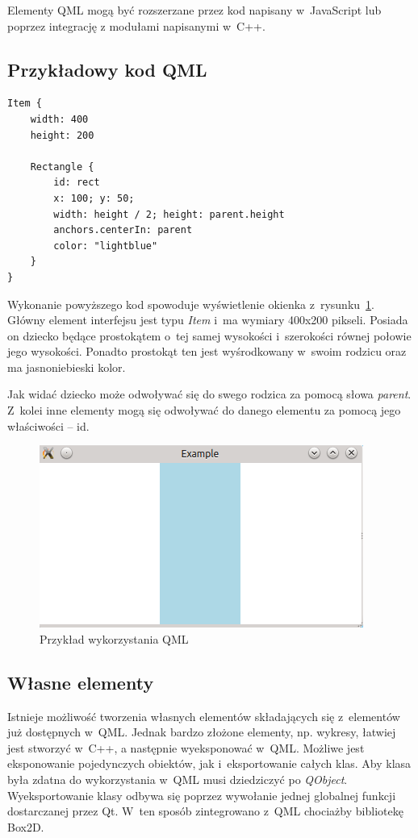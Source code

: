Elementy QML mogą być rozszerzane przez kod napisany w~JavaScript lub poprzez integrację z modułami napisanymi w~C++.

\subsection{Przykładowy kod QML}

\begin{lstlisting}[caption=Przykład QML, label=code:qml]
Item {
	width: 400
	height: 200

	Rectangle {
		id: rect
		x: 100; y: 50;
		width: height / 2; height: parent.height
		anchors.centerIn: parent
		color: "lightblue"
	}
}
\end{lstlisting}

Wykonanie powyższego kod spowoduje wyświetlenie okienka z~rysunku~\ref{rys:qml}. Główny element interfejsu jest typu \textit{Item} i~ma wymiary 400x200 pikseli. Posiada on dziecko będące prostokątem o~tej samej wysokości i~szerokości równej połowie jego wysokości. Ponadto prostokąt ten jest wyśrodkowany w~swoim rodzicu oraz ma jasnoniebieski kolor.

Jak widać dziecko może odwoływać się do swego rodzica za pomocą słowa \textit{parent}. Z~kolei inne elementy mogą się odwoływać do danego elementu za pomocą jego właściwości -- id.

\begin{figure}[H]
\centering
\includegraphics{img/qml.png}
\caption{Przykład wykorzystania QML}\label{rys:qml}
\end{figure}

\subsection{Własne elementy}
Istnieje możliwość tworzenia własnych elementów składających się z~elementów już dostępnych w~QML. Jednak bardzo złożone elementy, np. wykresy, łatwiej jest stworzyć w~C++, a następnie wyeksponować w~QML. Możliwe jest eksponowanie pojedynczych obiektów, jak i~eksportowanie całych klas. Aby klasa była zdatna do wykorzystania w~QML musi dziedziczyć po \textit{QObject}. Wyeksportowanie klasy odbywa się poprzez wywołanie jednej globalnej funkcji dostarczanej przez Qt. W~ten sposób zintegrowano z~QML chociażby bibliotekę Box2D.

